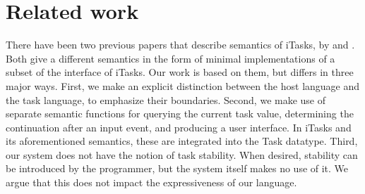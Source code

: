 


\section{Related work}

There have been two previous papers that describe semantics of iTasks, by \citet{conf/ifl/KoopmanPA08} and \citet{conf/ppdp/PlasmeijerLMAK12}.
Both give a different semantics in the form of minimal implementations of a subset of the interface of iTasks.
Our work is based on them, but differs in three major ways.
First, we make an explicit distinction between the host language and the task language, to emphasize their boundaries.
Second, we make use of separate semantic functions for querying the current task value, determining the continuation after an input event, and producing a user interface.
In iTasks and its aforementioned semantics, these are integrated into the Task datatype.
Third, our system does not have the notion of task stability.
When desired, stability can be introduced by the programmer, but the system itself makes no use of it.
We argue that this does not impact the expressiveness of our language.


